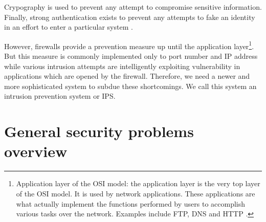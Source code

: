 Crypography is used to prevent any attempt to compromise sensitive information. Finally, strong authentication exists to prevent any attempts to fake an identity in an effort to enter a particular system \citep{76}. 

However, firewalls provide a prevention measure up until the application layer\footnote{Application layer of the OSI model: the application layer is the very top layer of the OSI model. It is used by network applications. These applications are what actually implement the functions performed by users to accomplish various tasks over the network. Examples include FTP, DNS and HTTP \citep{osi}.}. But this measure is commonly implemented only to port number and IP address while various intrusion attempts are intelligently exploiting vulnerability in applications which are opened by the firewall. Therefore, we need a newer and more sophisticated system to subdue these shortcomings. We call this system an intrusion prevention system or IPS.

\section{General security problems overview}

